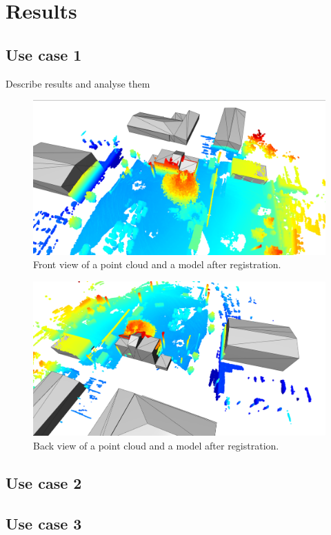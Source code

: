 

    \chapter{Results}

    \section{Use case 1}

    Describe results and analyse them

    \begin{figure}[H]
        \centering
        \includegraphics[scale=0.2]{images/solution_images/final_front.png}
        \caption{Front view of a point cloud and a model after registration.}
        \label{fig:final_front_model}
    \end{figure}
  
    \begin{figure}[H]
        \centering
        \includegraphics[scale=0.2]{images/solution_images/final_back.png}
        \caption{Back view of a point cloud and a model after registration.}
        \label{fig:final_back_model}
    \end{figure}

    \section{Use case 2}

    \section{Use case 3}

